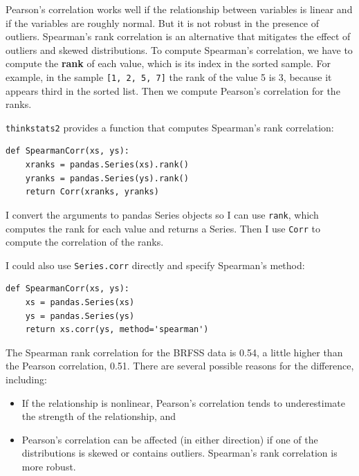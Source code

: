 \documentclass[12pt]{book}
\begin{document}
Pearson's correlation works well if the relationship between variables
is linear and if the variables are roughly normal.  But it is not
robust in the presence of outliers.
Spearman's rank correlation is an alternative that mitigates the
effect of outliers and skewed distributions.  To compute Spearman's
correlation, we have to compute the {\bf rank} of each value, which is its
index in the sorted sample.  For example, in the sample \verb"[1, 2, 5, 7]"
the rank of the value 5 is 3, because it appears third in the sorted
list.  Then we compute Pearson's correlation for the ranks.

\verb"thinkstats2" provides a function that computes Spearman's rank
correlation:

\begin{verbatim}
def SpearmanCorr(xs, ys):
    xranks = pandas.Series(xs).rank()
    yranks = pandas.Series(ys).rank()
    return Corr(xranks, yranks)
\end{verbatim}

I convert the arguments to pandas Series objects so I can use
\verb"rank", which computes the rank for each value and returns
a Series.  Then I use \verb"Corr" to compute the correlation
of the ranks.

I could also use \verb"Series.corr" directly and specify
Spearman's method:

\begin{verbatim}
def SpearmanCorr(xs, ys):
    xs = pandas.Series(xs)
    ys = pandas.Series(ys)
    return xs.corr(ys, method='spearman')
\end{verbatim}

The Spearman rank correlation for the BRFSS data is 0.54, a little
higher than the Pearson correlation, 0.51.  There are several possible
reasons for the difference, including:

\begin{itemize}

\item If the relationship is
nonlinear, Pearson's correlation tends to underestimate the strength
of the relationship, and 

\item Pearson's correlation can be affected (in either direction)
if one of the distributions is skewed or contains outliers.  Spearman's
rank correlation is more robust.

\end{itemize}
\end{document}
